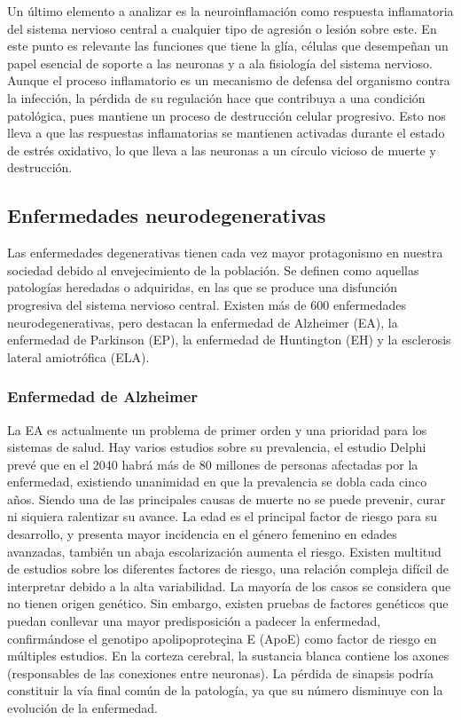 Un último elemento a analizar es la neuroinflamación como respuesta inflamatoria del sistema nervioso central a cualquier tipo de agresión o lesión sobre este. En este punto es relevante las funciones que tiene la glía, células que desempeñan un papel esencial de soporte a las neuronas y a ala fisiología del sistema nervioso. Aunque el proceso inflamatorio es un mecanismo de defensa del organismo contra la infección, la pérdida de su regulación hace que contribuya a una condición patológica, pues mantiene un proceso de destrucción celular progresivo. Esto nos lleva a que las respuestas inflamatorias se mantienen activadas durante el estado de estrés oxidativo, lo que lleva a las neuronas a un círculo vicioso de muerte y destrucción.	

\subsection{Enfermedades neurodegenerativas}

Las enfermedades degenerativas tienen cada vez mayor protagonismo en nuestra sociedad debido al envejecimiento de la población. Se definen como aquellas patologías heredadas o adquiridas, en las que se produce una disfunción progresiva del sistema nervioso central. Existen más de 600 enfermedades neurodegenerativas, pero destacan la enfermedad de Alzheimer (EA), la enfermedad de Parkinson (EP), la enfermedad de Huntington (EH) y la esclerosis lateral amiotrófica (ELA).

\subsubsection{Enfermedad de Alzheimer}

La EA es actualmente un problema de primer orden y una prioridad para los sistemas de salud. Hay varios estudios sobre su prevalencia, el estudio Delphi prevé que en el 2040 habrá más de 80 millones de personas afectadas por la enfermedad, existiendo unanimidad en que la prevalencia se dobla cada cinco años. Siendo una de las principales causas de muerte no se puede prevenir, curar ni siquiera ralentizar su avance.
La edad es el principal factor de riesgo para su desarrollo, y presenta mayor incidencia en el género femenino en edades avanzadas, también un abaja escolarización aumenta el riesgo. Existen multitud de estudios sobre los diferentes factores de riesgo, una relación compleja difícil de interpretar debido a la alta variabilidad. La mayoría de los casos se considera que no tienen origen genético. Sin embargo, existen pruebas de factores genéticos que puedan conllevar una mayor predisposición a padecer la enfermedad, confirmándose el genotipo apolipoproteçina E (ApoE) como factor de riesgo en múltiples estudios.
En la corteza cerebral, la sustancia blanca contiene los axones (responsables de las conexiones entre neuronas). La pérdida de sinapsis podría constituir la vía final común de la patología, ya que su número disminuye con la evolución de la enfermedad.\\

